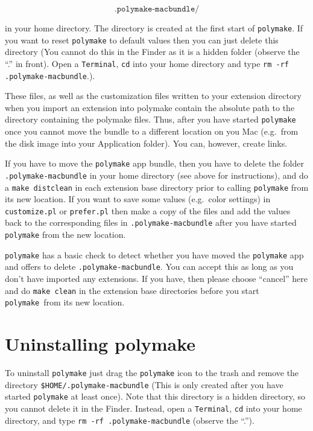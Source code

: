 \documentclass[a4paper]{amsart}
\newcommand{\polymake}{\texttt{polymake}\xspace}
\begin{document}
\[\texttt{.polymake-macbundle/} \]

in your home directory. The directory is created at the first start of
\polymake. If you want to reset \polymake to default values then you
can just delete this directory (You cannot do this in the Finder as it
is a hidden folder (observe the ``.'' in front). Open a \texttt{Terminal},
\texttt{cd} into your home directory and type \texttt{rm -rf
  .polymake-macbundle}.).

These files, as well as the customization files written to your
extension directory when you import an extension into polymake contain
the absolute path to the directory containing the polymake
files. Thus, after you have started \polymake once you cannot move
the bundle to a different location on you Mac (e.g.\ from the disk
image into your Application folder). You can, however, create links.

If you have to move the \polymake app bundle, then you have to delete
the folder \texttt{.polymake-macbundle} in your home directory (see
above for instructions), and do a \texttt{make distclean} in each
extension base directory prior to calling \polymake from its new
location. If you want to save some values (e.g.\ color settings) in
\texttt{customize.pl} or \texttt{prefer.pl} then make a copy of the
files and add the values back to the corresponding files in
\texttt{.polymake-macbundle} after you have started \polymake from
the new location.

\polymake has a basic check to detect whether you have moved the
\polymake app and offers to delete \texttt{.polymake-macbundle}. You
can accept this as long as you don't have imported any extensions. If
you have, then please choose ``cancel'' here and do \texttt{make
  clean} in the extension base directories before you start \polymake\
from its new location.

\section*{Uninstalling polymake}

To uninstall \polymake just drag the \polymake icon to the trash and
remove the directory \texttt{\${HOME}/.polymake-macbundle} (This is
only created after you have started \polymake at least once). Note
that this directory is a hidden directory, so you cannot delete it
in the Finder. Instead, open a \texttt{Terminal}, \texttt{cd} into
your home directory, and type \texttt{rm -rf .polymake-macbundle}
(observe the ``.'').
\end{document}
